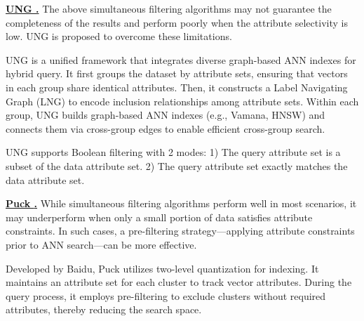 \documentclass[sigconf, nonacm]{acmart}
\begin{document}
	
	\noindent\textbf{\underline{UNG \cite{UNG}.}} The above simultaneous filtering algorithms may not guarantee the completeness of the results and perform poorly when the attribute selectivity is low. UNG is proposed to overcome these limitations.
	
	UNG is a unified framework that integrates diverse graph-based ANN indexes for hybrid query. It first groups the dataset by attribute sets, ensuring that vectors in each group share identical attributes. Then, it constructs a Label Navigating Graph (LNG) to encode inclusion relationships among attribute sets. Within each group, UNG builds graph-based ANN indexes (e.g., Vamana, HNSW) and connects them via cross-group edges to enable efficient cross-group search.
	
	UNG supports Boolean filtering with 2 modes:  
	1) The query attribute set is a subset of the data attribute set.  
	2) The query attribute set exactly matches the data attribute set.
	
	
	
	
	\noindent\textbf{\underline{Puck \cite{puck}.}}  
	While simultaneous filtering algorithms perform well in most scenarios, it may underperform when only a small portion of data satisfies attribute constraints. In such cases, a pre-filtering strategy—applying attribute constraints prior to ANN search—can be more effective.
	
	Developed by Baidu, Puck utilizes two-level quantization for indexing. It maintains an attribute set for each cluster to track vector attributes. During the query process, it employs pre-filtering to exclude clusters without required attributes, thereby reducing the search space.
	
\end{document}
